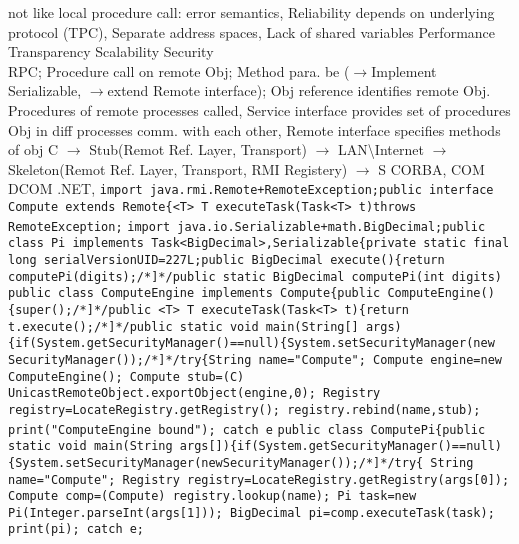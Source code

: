 not like local procedure call:
error semantics,
Reliability depends on underlying protocol (TPC),
Separate address spaces,
Lack of shared variables 
\bluetext{+}
Performance Transparency
\bluetext{+}
Scalability
\bluetext{+}
Security
\\
 RPC;
Procedure call on remote Obj;
Method para. be 
($\rightarrow$Implement Serializable, 
$\rightarrow$extend Remote interface);
Obj reference identifies remote Obj.
\textbar \textbar
{}
Procedures of remote processes called,
Service interface provides set of procedures
Obj in diff processes comm. with each other, 
Remote interface specifies methods of obj
\textbar
{}
C
$\rightarrow$
Stub(Remot Ref. Layer, Transport)
$\rightarrow$
LAN\textbackslash Internet
$\rightarrow$
Skeleton(Remot Ref. Layer, Transport, RMI Registery)
$\rightarrow$
S
\textbar
{}
CORBA, COM DCOM .NET,
\lstinline{import java.rmi.Remote+RemoteException;public interface Compute extends Remote{<T> T executeTask(Task<T> t)throws RemoteException;}
\lstinline{import java.io.Serializable+math.BigDecimal;public class Pi implements Task<BigDecimal>,Serializable{private static final long serialVersionUID=227L;public BigDecimal execute(){return computePi(digits);/*]*/public static BigDecimal computePi(int digits)}
\lstinline{public class ComputeEngine implements Compute{public ComputeEngine(){super();/*]*/public <T> T executeTask(Task<T> t){return t.execute();/*]*/public static void main(String[] args){if(System.getSecurityManager()==null){System.setSecurityManager(new SecurityManager());/*]*/try{String name="Compute"; Compute engine=new ComputeEngine(); Compute stub=(C) UnicastRemoteObject.exportObject(engine,0); Registry registry=LocateRegistry.getRegistry(); registry.rebind(name,stub); print("ComputeEngine bound"); catch e}
\lstinline{public class ComputePi{public static void main(String args[]){if(System.getSecurityManager()==null){System.setSecurityManager(newSecurityManager());/*]*/try{ String name="Compute"; Registry registry=LocateRegistry.getRegistry(args[0]); Compute comp=(Compute) registry.lookup(name); Pi task=new Pi(Integer.parseInt(args[1])); BigDecimal pi=comp.executeTask(task); print(pi); catch e;}
